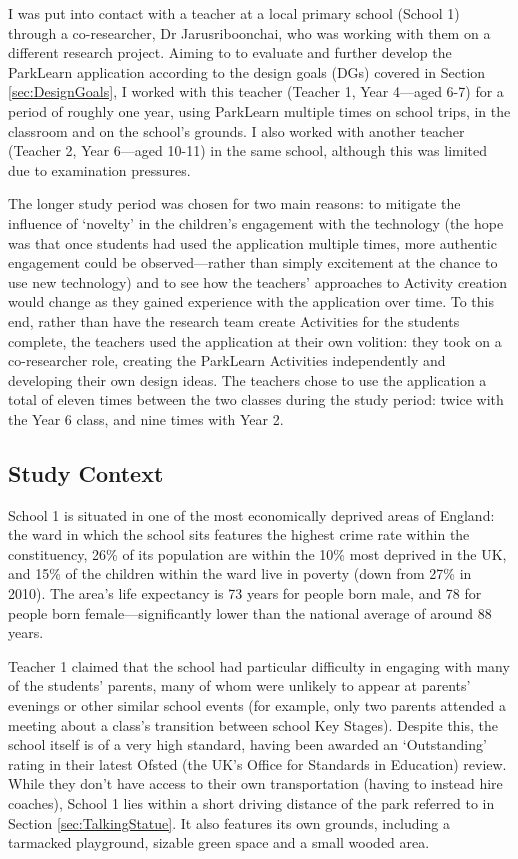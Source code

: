 I was put into contact with a teacher at a local primary school (School 1) through a co-researcher, Dr Jarusriboonchai, who was working with them on a different research project. Aiming to to evaluate and further develop the ParkLearn application according to the design goals (DGs) covered in Section \ref{sec:DesignGoals}, I worked with this teacher (Teacher 1, Year 4---aged 6-7) for a period of roughly one year, using ParkLearn multiple times on school trips, in the classroom and on the school's grounds. I also worked with another teacher (Teacher 2, Year 6---aged 10-11) in the same school, although this was limited due to examination pressures. 

The longer study period was chosen for two main reasons: to mitigate the influence of `novelty' in the children’s engagement with the technology (the hope was that once students had used the application multiple times, more authentic engagement could be observed---rather than simply excitement at the chance to use new technology) \citep{Sharples2013} and to see how the teachers' approaches to Activity creation would change as they gained experience with the application over time. To this end, rather than have the research team create Activities for the students complete, the teachers used the application at their own volition: they took on a co-researcher role, creating the ParkLearn Activities independently and developing their own design ideas. The teachers chose to use the application a total of eleven times between the two classes during the study period: twice with the Year 6 class, and nine times with Year 2.

\subsection{Study Context}
School 1 is situated in one of the most economically deprived areas of England: the ward in which the school sits features the highest crime rate within the constituency, 26\% of its population are within the 10\% most deprived in the UK, and 15\% of the children within the ward live in poverty (down from 27\% in 2010). The area's life expectancy is 73 years for people born male, and 78 for people born female---significantly lower than the national average of around 88 years.

Teacher 1 claimed that the school had particular difficulty in engaging with many of the students' parents, many of whom were unlikely to appear at parents' evenings or other similar school events (for example, only two parents attended a meeting about a class's transition between school Key Stages). Despite this, the school itself is of a very high standard, having been awarded an `Outstanding' rating in their latest Ofsted (the UK’s Office for Standards in Education) review. While they don't have access to their own transportation (having to instead hire coaches), School 1 lies within a short driving distance of the park referred to in Section \ref{sec:TalkingStatue}. It also features its own grounds, including a tarmacked playground, sizable green space and a small wooded area.

